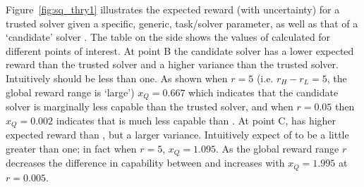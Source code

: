 %
%
Figure~\ref{fig:sq_thry1} illustrates the expected reward (with uncertainty) for a trusted solver \solvetrust{} given a specific, generic, task/solver parameter, as well as that of a `candidate' solver \solve.  %
The table on the side shows the values of \xQ{} calculated for different points of interest. At point B the candidate solver has a lower expected reward than the trusted solver and a higher variance than the trusted solver. Intuitively \xQ{} should be less than one. As shown when $r=5$ (i.e. $r_H-r_L=5$, the global reward range is `large') $x_Q=0.667$ which indicates that the candidate solver is marginally less capable than the trusted solver, and when $r=0.05$ then $x_Q=0.002$ indicates that \solve{} is much less capable than \solvetrust. At point C, \solve{} has higher expected reward than \solvetrust, but a larger variance. Intuitively expect \xQ{} of \solve{} to be a little greater than one; in fact when $r=5$, $x_Q=1.095$. As the global reward range $r$ decreases the difference in capability between \solve{} and \solvetrust{} increases with $x_Q=1.995$ at $r=0.005$. %

